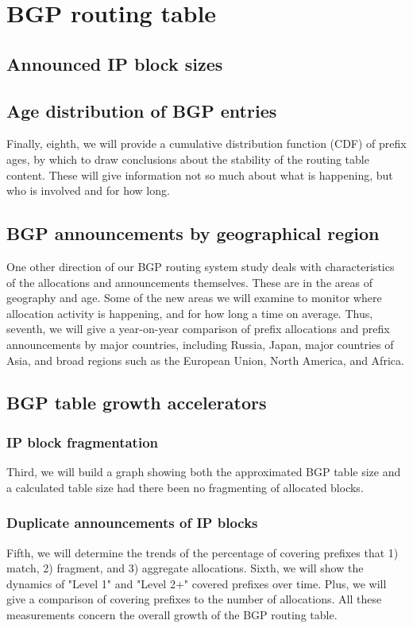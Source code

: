 \section{BGP routing table}
\label{sec:bgp}


\subsection{Announced IP block sizes}

\subsection{Age distribution of BGP entries}
Finally, eighth, we will provide a cumulative distribution function (CDF) of prefix ages, by which to draw conclusions about the stability of the routing table content. These will give information not so much about what is happening, but who is involved and for how long.

\subsection{BGP announcements by geographical region}
One other direction of our BGP routing system study deals with characteristics of the allocations and announcements themselves.  These are in the areas of geography and age.  Some of the new areas we will examine to monitor where allocation activity is happening, and for how long a time on average.  Thus, seventh, we will give a year-on-year comparison of prefix allocations and prefix announcements by major countries, including Russia, Japan, major countries of Asia, and broad regions such as the European Union, North America, and Africa.

\subsection{BGP table growth accelerators}

\subsubsection{IP block fragmentation}
Third, we will build a graph showing both the approximated BGP table size and a calculated table size had there been no fragmenting of allocated blocks.

\subsubsection{Duplicate announcements of IP blocks}
Fifth, we will determine the trends of the percentage of covering prefixes that 1) match, 2) fragment, and 3) aggregate allocations.
Sixth, we will show the dynamics of "Level 1" and "Level 2+" covered prefixes over time. Plus, we will give a comparison of covering prefixes to the number of allocations.  All these measurements concern the overall growth of the BGP routing table.